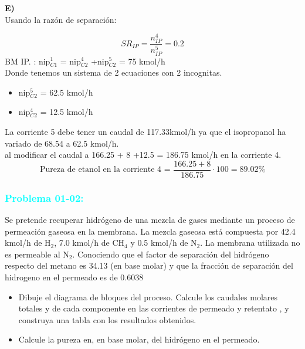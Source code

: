 \documentclass{report}
\begin{document}
\vspace{1\baselineskip}
\noindent \textbf{E)}\\

\noindent Usando la razón de separación:

\begin{equation*}
	SR_{IP} = \frac{n_{IP}^4}{n_{IP}^5} = 0.2
\end{equation*}
\vspace{1\baselineskip}
\noindent BM IP. : nip$^1_{C1}$ = nip$^4_{C2}$ +nip$^5_{C2}$ = 75 kmol/h\\
\vspace{1\baselineskip}
\noindent Donde tenemos un sistema de 2 ecuaciones con 2 incognitas.\\

\begin{itemize}
	\item nip$^5_{C2}$ = 62.5 kmol/h
	\item nip$^4_{C2}$ = 12.5 kmol/h
\end{itemize}
\vspace{1\baselineskip}
\begin{raggedright}
	La corriente 5 debe tener un caudal de 117.33kmol/h ya que el isopropanol ha variado de 68.54 a 62.5 kmol/h.\\
	\vspace{1\baselineskip}
	al modificar el caudal a  166.25 + 8 +12.5 = 186.75 kmol/h en la corriente 4.\\
\begin{equation*}
	\text{Pureza de etanol en la corriente 4 = } \frac{166.25 + 8}{186.75} \cdot 100 = 89.02\%
\end{equation*}
\end{raggedright}

\subsubsection{\textbf{\textcolor{cyan}{Problema 01-02:}}} 
\begin{raggedright}
	Se pretende recuperar hidrógeno de una mezcla de gases mediante un proceso de permeación gaseosa en la membrana. La mezcla gaseosa está compuesta por 42.4 kmol/h de H$_2$, 7.0 kmol/h de CH$_4$ y 0.5 kmol/h de N$_2$. 
	La membrana utilizada no es permeable al N$_2$. Conociendo que el factor de separación del hidrógeno respecto del metano es 34.13 (en base molar) y que la fracción de separación del hidrogeno en el permeado es de 0.6038 
	\begin{itemize}
		\item Dibuje el diagrama de bloques del proceso. Calcule los caudales molares totales y de cada componente en las corrientes de permeado y retentato , y construya una tabla con los resultados obtenidos.
		\item Calcule la pureza en, en base molar, del hidrógeno en el permeado.
	\end{itemize}
\end{raggedright} 
\end{document}
